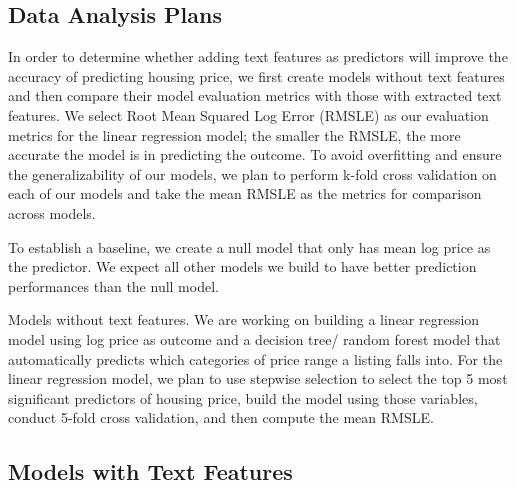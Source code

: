 \documentclass[10pt,letterpaper]{article}
\begin{document}
\hypertarget{data-analysis-plans}{%
\subsection{Data Analysis Plans}\label{data-analysis-plans}}

In order to determine whether adding text features as predictors will
improve the accuracy of predicting housing price, we first create models
without text features and then compare their model evaluation metrics
with those with extracted text features. We select Root Mean Squared Log
Error (RMSLE) as our evaluation metrics for the linear regression model;
the smaller the RMSLE, the more accurate the model is in predicting the
outcome. To avoid overfitting and ensure the generalizability of our
models, we plan to perform k-fold cross validation on each of our models
and take the mean RMSLE as the metrics for comparison across models.

To establish a baseline, we create a null model that only has mean log
price as the predictor. We expect all other models we build to have
better prediction performances than the null model.

Models without text features. We are working on building a linear
regression model using log price as outcome and a decision tree/ random
forest model that automatically predicts which categories of price range
a listing falls into. For the linear regression model, we plan to use
stepwise selection to select the top 5 most significant predictors of
housing price, build the model using those variables, conduct 5-fold
cross validation, and then compute the mean RMSLE.

\hypertarget{models-with-text-features}{%
\subsection{Models with Text Features}\label{models-with-text-features}}
\end{document}
